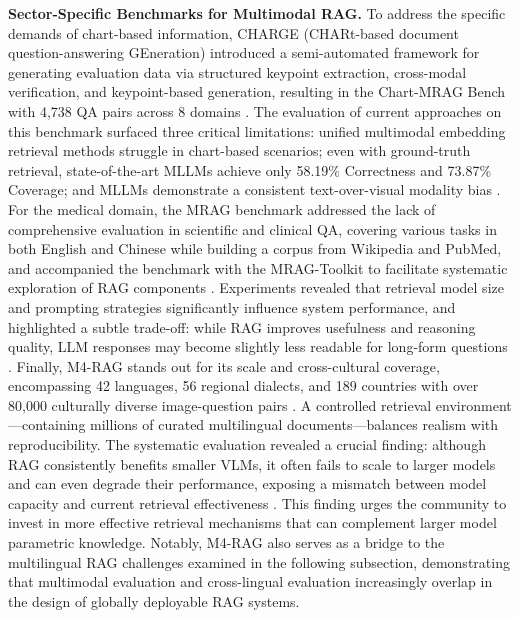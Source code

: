 \documentclass[11pt]{article}
\begin{document}
\textbf{Sector-Specific Benchmarks for Multimodal RAG.} To address the specific demands of chart-based information, CHARGE (CHARt-based document question-answering GEneration) introduced a semi-automated framework for generating evaluation data via structured keypoint extraction, cross-modal verification, and keypoint-based generation, resulting in the Chart-MRAG Bench with 4,738 QA pairs across 8 domains \cite{ref366}. The evaluation of current approaches on this benchmark surfaced three critical limitations: unified multimodal embedding retrieval methods struggle in chart-based scenarios; even with ground-truth retrieval, state-of-the-art MLLMs achieve only 58.19\% Correctness and 73.87\% Coverage; and MLLMs demonstrate a consistent text-over-visual modality bias \cite{ref366}. For the medical domain, the MRAG benchmark addressed the lack of comprehensive evaluation in scientific and clinical QA, covering various tasks in both English and Chinese while building a corpus from Wikipedia and PubMed, and accompanied the benchmark with the MRAG-Toolkit to facilitate systematic exploration of RAG components \cite{ref367}. Experiments revealed that retrieval model size and prompting strategies significantly influence system performance, and highlighted a subtle trade-off: while RAG improves usefulness and reasoning quality, LLM responses may become slightly less readable for long-form questions \cite{ref367}. Finally, M4-RAG stands out for its scale and cross-cultural coverage, encompassing 42 languages, 56 regional dialects, and 189 countries with over 80,000 culturally diverse image-question pairs \cite{ref368}. A controlled retrieval environment---containing millions of curated multilingual documents---balances realism with reproducibility. The systematic evaluation revealed a crucial finding: although RAG consistently benefits smaller VLMs, it often fails to scale to larger models and can even degrade their performance, exposing a mismatch between model capacity and current retrieval effectiveness \cite{ref368}. This finding urges the community to invest in more effective retrieval mechanisms that can complement larger model parametric knowledge. Notably, M4-RAG also serves as a bridge to the multilingual RAG challenges examined in the following subsection, demonstrating that multimodal evaluation and cross-lingual evaluation increasingly overlap in the design of globally deployable RAG systems.
\end{document}
